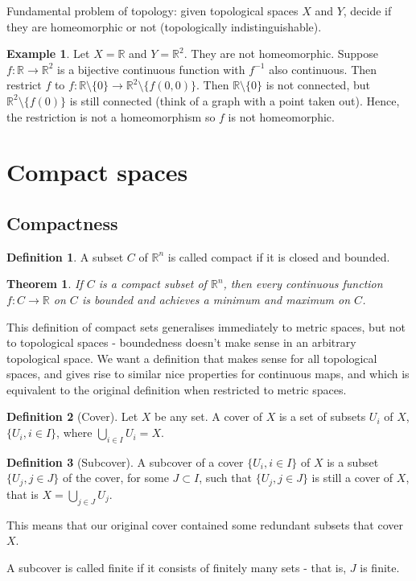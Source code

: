 \documentclass{article}
\theoremstyle{definition}
\newtheorem{defn}{Definition}[section]
\newtheorem{exmp}{Example}[section]
\theoremstyle{plain}%
\newtheorem{thm}{Theorem}[section]
\theoremstyle{remark}
\newcommand{\Union}{\bigcup}
\newcommand{\R}{\mathbb{R}}
\begin{document}
Fundamental problem of topology: given topological spaces $X$ and $Y$, decide if they are homeomorphic or not (topologically indistinguishable).

\begin{exmp}
    Let $X = \R$ and $Y = \R^2$. They are not homeomorphic. Suppose $f: \R \to \R^2$ is a bijective continuous function with $f^{-1}$ also continuous. Then restrict $f$ to $f : \R \setminus \{0\} \to \R^2 \setminus \{f(0,0)\}$. Then $\R \setminus \{0\}$ is not connected, but $\R^2 \setminus \{f(0)\}$ is still connected (think of a graph with a point taken out). Hence, the restriction is not a homeomorphism so $f$ is not homeomorphic.
\end{exmp}

\section{Compact spaces}

\subsection{Compactness}

\begin{defn}
    A subset $C$ of $\R^n$ is called compact if it is closed and bounded.
\end{defn}

\begin{thm}
    If $C$ is a compact subset of $\R^n$, then every continuous function $f : C \to \R$ on $C$ is bounded and achieves a minimum and maximum on $C$.
\end{thm}

This definition of compact sets generalises immediately to metric spaces, but not to topological spaces - boundedness doesn't make sense in an arbitrary topological space. We want a definition that makes sense for all topological spaces, and gives rise to similar nice properties for continuous maps, and which is equivalent to the original definition when restricted to metric spaces.

\begin{defn}[Cover]
    Let $X$ be any set. A cover of $X$ is a set of subsets $U_i$ of $X$, $\{U_i, i \in I\}$, where  $\Union_{i \in I} U_i = X$.
\end{defn}

\begin{defn}[Subcover]
    A subcover of a cover $\{U_i, i \in I\}$ of $X$ is a subset $\{U_j, j \in J\}$ of the cover, for some $J \subset I$, such that $\{U_j, j \in J\}$ is still a cover of $X$, that is $X = \Union_{j \in J} U_j$.
    
    This means that our original cover contained some redundant subsets that cover $X$.
    
    A subcover is called finite if it consists of finitely many sets - that is, $J$ is finite.
\end{defn}
\end{document}
